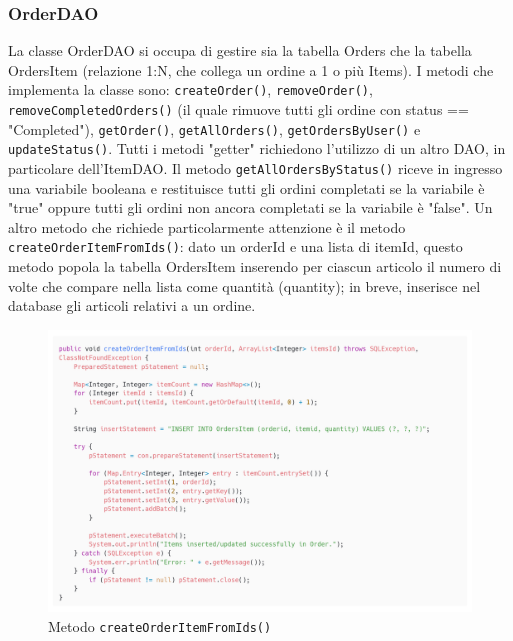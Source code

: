 \documentclass{article}
\begin{document}
\subsubsection{OrderDAO}
La classe OrderDAO si occupa di gestire sia la tabella Orders che la tabella OrdersItem (relazione 1:N, che collega un ordine a 1 o più Items). I metodi che implementa la classe sono: \texttt{createOrder()}, \texttt{removeOrder()}, \texttt{removeCompletedOrders()} (il quale rimuove tutti gli ordine con status == "Completed"), \texttt{getOrder()}, \texttt{getAllOrders()}, \texttt{getOrdersByUser()} e \texttt{updateStatus()}. Tutti i metodi "getter" richiedono l'utilizzo di un altro DAO, in particolare dell'ItemDAO. Il metodo \texttt{getAllOrdersByStatus()} riceve in ingresso una variabile booleana e restituisce tutti gli ordini completati se la variabile è "true" oppure tutti gli ordini non ancora completati se la variabile è "false".
Un altro metodo che richiede particolarmente attenzione è il metodo \texttt{createOrderItemFromIds()}: dato un orderId e una lista di itemId, questo metodo popola la tabella OrdersItem inserendo per ciascun articolo il numero di volte che compare nella lista come quantità (quantity); in breve, inserisce nel database gli articoli relativi a un ordine.

\begin{figure}[h]
    \includegraphics[width=1.0\linewidth]{imgs/snippets/Code_CreateOrderItemFromIds.png}
    \caption{Metodo \texttt{createOrderItemFromIds()}}
    \label{code_createOrderItemFromIds}
\end{figure}
\end{document}

